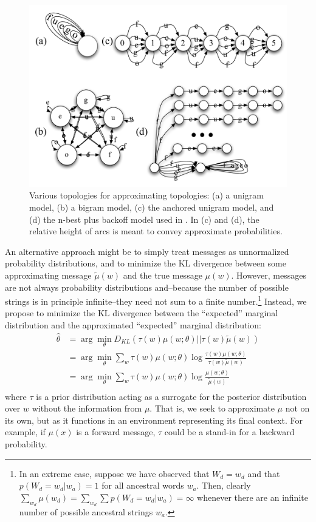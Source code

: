 \documentclass[11pt,a4paper]{article}
\begin{document}
\begin{figure}
  \centering
  \includegraphics[scale=0.35]{fsa}
  \caption{Various topologies for approximating topologies: (a) a
  unigram model, (b) a bigram model, (c) the anchored unigram model,
  and (d) the n-best plus backoff model used in
  . In (c) and (d), the relative height
  of arcs is meant to convey approximate probabilities.}
  \label{fig:fsa}
\end{figure}

An alternative approach might be to simply treat messages as
unnormalized probability distributions, and to minimize the KL
divergence between some approximating message $\tilde\mu(w)$ and
the true message $\mu(w)$.  However, messages are not always
probability distributions and--because the number of possible
strings is in principle infinite--they need not sum to a finite
number.\footnote{In an extreme case, suppose we have observed that
$W_d=w_d$ and that $p(W_d=w_d|w_a)=1$ for all ancestral words $w_a$.
Then, clearly $\sum_{w_d} \mu(w_d) = \sum_{w_d} \sum p(W_d=w_d|w_a)
= \infty$ whenever there are an infinite number of possible ancestral
strings $w_a$.} Instead, we propose to minimize the KL divergence
between the ``expected'' marginal distribution and the approximated
``expected'' marginal distribution:
\begin{equation}
  \begin{split}
    \hat\theta &= \arg\!\min_{\theta} D_{KL}(\tau(w)\mu(w;\theta)||\tau(w)\tilde\mu(w) ) \\
    &= \arg\!\min_{\theta} \sum_w \tau(w) \mu(w;\theta) \log \frac{\tau(w)\mu(w;\theta)}{\tau(w)\tilde\mu(w)} \\
    &= \arg\!\min_{\theta} \sum_w \tau(w) \mu(w;\theta) \log \frac{\mu(w;\theta)}{\tilde\mu(w)} \\
   \end{split}
 \end{equation}
where $\tau$ is a prior distribution acting as a surrogate for the
posterior distribution over $w$ without the information from $\mu$.
That is, we seek to approximate $\mu$ not on its own, but as it
functions in an environment representing its final context. For
example, if $\mu(x)$ is a forward message, $\tau$ could be a stand-in
for a backward probability.
\end{document}
